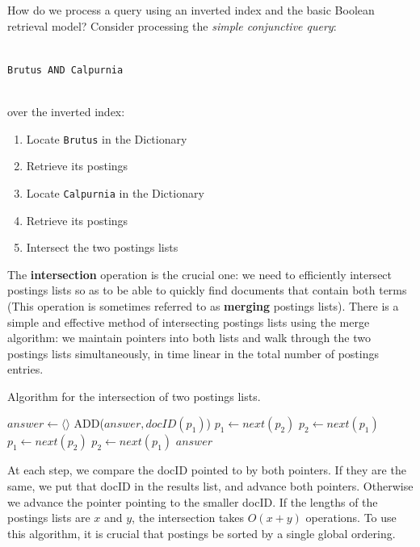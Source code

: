 \documentclass[letterpaper,11pt]{article}
\newcommand{\code}[1]{\texttt{#1}}
\begin{document}
How do we process a query using an inverted index and the basic Boolean retrieval model? Consider processing the \textit{simple conjunctive query}:\\
~\\
\centerline{\code{Brutus AND Calpurnia}}
~\\
over the inverted index:
\begin{enumerate}
    \item Locate \code{Brutus} in the Dictionary
    \item Retrieve its postings
    \item Locate \code{Calpurnia} in the Dictionary
    \item Retrieve its postings
    \item Intersect the two postings lists
\end{enumerate}
The \textbf{intersection} operation is the crucial one: we need to efficiently intersect postings lists so as to be able to quickly find documents that contain both terms (This operation is sometimes referred to as \textbf{merging} postings lists). There is a simple and effective method of intersecting postings lists using the merge algorithm: we maintain pointers into both lists and walk through the two postings lists simultaneously, in time linear in the total number of postings entries.
\begin{algorithm}[H]
\begin{algorithmic}[1]
\label{INTERSECT} %
\caption{Algorithm for the intersection of two postings lists.}
    \State $answer \gets \langle \rangle$
            \State ADD($answer, docID(p_1)$)
            \State $p_1 \gets next(p_2)$
            \State $p_2 \gets next(p_1)$
            \State $p_1 \gets next(p_2)$
            \State $p_2 \gets next(p_1)$
        \EndIf
    \EndWhile
    \State \Return $answer$
\EndFunction
\end{algorithmic}
\end{algorithm}
At each step, we compare the docID pointed to by both pointers. If they are the same, we put that docID in the results list, and advance both pointers. Otherwise we advance the pointer pointing to the smaller docID. If the lengths of the postings lists are $x$ and $y$, the intersection takes $O(x + y)$ operations. To use this algorithm, it is crucial that postings be sorted by a single global ordering.
\end{document}
